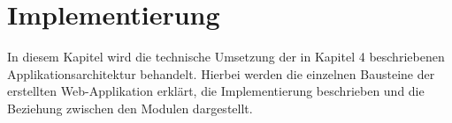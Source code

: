 
\newpage
\section{Implementierung}
\label{sec:implementierung}


In diesem Kapitel wird die technische Umsetzung der in Kapitel 4 beschriebenen Applikationsarchitektur behandelt.
Hierbei werden die einzelnen Bausteine der erstellten Web-Applikation erklärt, die Implementierung beschrieben
und die Beziehung zwischen den Modulen dargestellt.





